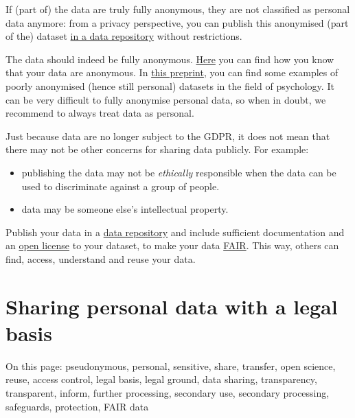 \documentclass[
]{book}
\providecommand{\tightlist}{%
  \setlength{\itemsep}{0pt}\setlength{\parskip}{0pt}}
\begin{document}
If (part of) the data are truly fully anonymous, they are not classified as
personal data anymore: from a privacy perspective, you can publish this
anonymised (part of the) dataset
\href{https://www.uu.nl/en/research/research-data-management/guides/publishing-and-sharing-data}{in a data repository}
without restrictions.

The data should indeed be fully anonymous.
\protect\hyperlink{pseudonymisation-anonymisation}{Here} you can find how you know that your data
are anonymous. In
\href{https://doi.org/10.31234/osf.io/ybzu9}{this preprint}, you
can find some examples of poorly anonymised (hence still personal) datasets in
the field of psychology. It can be very difficult to fully anonymise personal
data, so when in doubt, we recommend to always treat data as personal.

Just because data are no longer subject to the GDPR, it does not mean that there
may not be other concerns for sharing data publicly. For example:

\begin{itemize}
\tightlist
\item
  publishing the data may not be \emph{ethically} responsible when the data can be
  used to discriminate against a group of people.
\item
  data may be someone else's intellectual property.
\end{itemize}

Publish your data in a
\href{https://tools.uu.nl/repository-decision-tool/}{data repository}
and include sufficient documentation and an
\href{https://www.uu.nl/en/research/research-data-management/guides/publishing-and-sharing-data}{open license}
to your dataset, to make your data
\href{https://www.uu.nl/en/research/research-data-management/guides/how-to-make-your-data-fair}{FAIR}.
This way, others can find, access, understand and reuse your data.

\hypertarget{share-reuse-legal-basis}{%
\section{Sharing personal data with a legal basis}\label{share-reuse-legal-basis}}

On this page: pseudonymous, personal, sensitive, share, transfer, open science,
reuse, access control, legal basis, legal ground, data sharing, transparency,
transparent, inform, further processing, secondary use, secondary processing,
safeguards, protection, FAIR data
\end{document}
